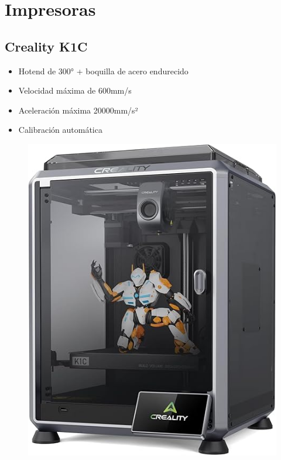 \documentclass[compacto,5pt,comentarios]{aleph-notas}
\begin{document}
\encabezado

\section{Impresoras}




\subsection{Creality K1C}     

\begin{advertencia}
\begin{itemize}
    \item Hotend de 300° + boquilla de acero endurecido
    \item Velocidad máxima de 600mm/s
    \item Aceleración máxima 20000mm/s²
    \item Calibración automática
\end{itemize}
\end{advertencia}


\begin{figure}[h]
    \centering
    \includegraphics[width=0.5\linewidth]{Logos/K1C.jpg}
    \label{fig:enter-label}
\end{figure}

\end{document}
